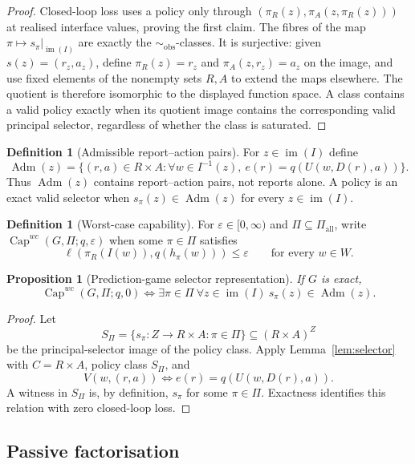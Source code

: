 \documentclass[11pt]{article}
\theoremstyle{plain}
\newtheorem{proposition}[theorem]{Proposition}
\theoremstyle{definition}
\newtheorem{definition}[theorem]{Definition}
\theoremstyle{remark}
\newcommand{\im}{\operatorname{im}}
\newcommand{\Capability}{\operatorname{Cap}}
\newcommand{\Adm}{\operatorname{Adm}}
\newcommand{\eps}{\varepsilon}
\begin{document}
\begin{proof}
Closed-loop loss uses a policy only through
$(\pi_R(z),\pi_A(z,\pi_R(z)))$ at realised interface values, proving the first
claim. The fibres of the map
$\pi\mapsto s_\pi|_{\im(I)}$ are exactly the
$\sim_{\mathrm{obs}}$-classes. It is surjective: given
$s(z)=(r_z,a_z)$, define $\pi_R(z)=r_z$ and
$\pi_A(z,r_z)=a_z$ on the image, and use fixed elements of the nonempty sets
$R,A$ to extend the maps elsewhere. The quotient is therefore isomorphic to the
displayed function space. A class contains a valid policy exactly when its
quotient image contains the corresponding valid principal selector, regardless
of whether the class is saturated.
\end{proof}

\begin{definition}[Admissible report--action pairs]\label{def:admissible-pairs}
For $z\in\im(I)$ define
\[
\Adm(z)=\{(r,a)\in R\times A:
\forall w\in I^{-1}(z),\ e(r)=q(U(w,D(r),a))\}.
\]
Thus $\Adm(z)$ contains report--action pairs, not reports alone. A policy is an
exact valid selector when $s_\pi(z)\in\Adm(z)$ for every $z\in\im(I)$.
\end{definition}

\begin{definition}[Worst-case capability]\label{def:cap}
For $\eps\in[0,\infty)$ and $\Pi\subseteq\Pi_{\mathrm{all}}$, write
$\Capability^{wc}(G,\Pi;q,\eps)$ when some $\pi\in\Pi$ satisfies
\[
\ell(\pi_R(I(w)),q(h_\pi(w)))\le\eps
\qquad\text{for every }w\in W.
\]
\end{definition}

\begin{proposition}[Prediction-game selector representation]\label{prop:game-selector}
If $G$ is exact,
\[
\Capability^{wc}(G,\Pi;q,0)
\iff
\exists\pi\in\Pi\ \forall z\in\im(I)\ s_\pi(z)\in\Adm(z).
\]
\end{proposition}

\begin{proof}
Let
\[
S_\Pi=\{s_\pi:Z\to R\times A:\pi\in\Pi\}
\subseteq (R\times A)^Z
\]
be the principal-selector image of the policy class. Apply
Lemma~\ref{lem:selector} with $C=R\times A$, policy class $S_\Pi$, and
\[
V(w,(r,a))\iff e(r)=q(U(w,D(r),a)).
\]
A witness in $S_\Pi$ is, by definition, $s_\pi$ for some $\pi\in\Pi$.
Exactness identifies this relation with zero closed-loop loss.
\end{proof}

\subsection{Passive factorisation}
\end{document}
